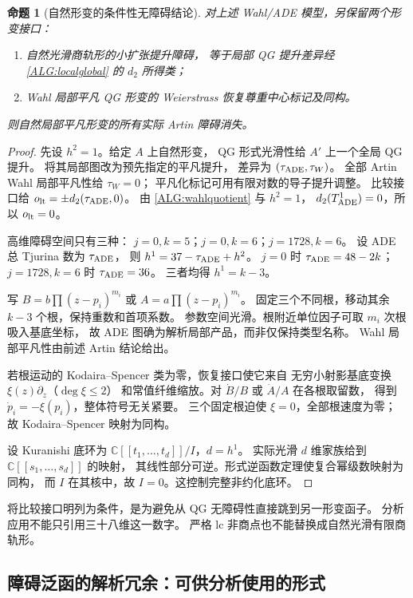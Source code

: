 \documentclass[UTF8,fontset=fandol,zihao=-4,oneside,openany]{ctexbook}
\theoremstyle{cjkplain}
\newtheorem{proposition}[theorem]{命题}
\numberwithin{equation}{chapter}
\begin{document}
\begin{proposition}[自然形变的条件性无障碍结论]
\label{ALG:naturalconditional}
对上述 Wahl/ADE 模型，另保留两个形变接口：
\begin{enumerate}
\item 自然光滑商轨形的小扩张提升障碍，
等于局部 QG 提升差异经 \eqref{ALG:localglobal} 的 $d_2$ 所得类；
\item Wahl 局部平凡 QG 形变的 Weierstrass 恢复尊重中心标记及同构。
\end{enumerate}
则自然局部平凡形变的所有实际 Artin 障碍消失。
\end{proposition}
\begin{proof}
先设 $h^2=1$。给定 $A$ 上自然形变，
QG 形式光滑性给 $A'$ 上一个全局 QG 提升。
将其局部图改为预先指定的平凡提升，
差异为 $(\tau_{\rm ADE},\tau_W)$。
全部 Artin Wahl 局部平凡性给 $\tau_W=0$；
平凡化标记可用有限对数的导子提升调整。
比较接口给 $o_{\rm lt}=\pm d_2(\tau_{\rm ADE},0)$。
由 \eqref{ALG:wahlquotient} 与 $h^2=1$，
$d_2(T^1_{\rm ADE})=0$，所以 $o_{\rm lt}=0$。

高维障碍空间只有三种：
$j=0,k=5$；$j=0,k=6$；$j=1728,k=6$。
设 ADE 总 Tjurina 数为 $\tau_{\rm ADE}$，
则 $h^1=37-\tau_{\rm ADE}+h^2$。
$j=0$ 时 $\tau_{\rm ADE}=48-2k$；
$j=1728,k=6$ 时 $\tau_{\rm ADE}=36$。
三者均得 $h^1=k-3$。

写 $B=b\prod(z-p_i)^{m_i}$ 或 $A=a\prod(z-p_i)^{m_i}$。
固定三个不同根，移动其余 $k-3$ 个根，保持重数和首项系数。
参数空间光滑。根附近单位因子可取 $m_i$ 次根吸入基底坐标，
故 ADE 图确为解析局部产品，而非仅保持类型名称。
Wahl 局部平凡性由前述 Artin 结论给出。

若根运动的 Kodaira--Spencer 类为零，恢复接口使它来自
无穷小射影基底变换 $\xi(z)\partial_z$（$\deg\xi\le2$）
和常值纤维缩放。对 $\dot B/B$ 或 $\dot A/A$ 在各根取留数，
得到 $\dot p_i=-\xi(p_i)$，整体符号无关紧要。
三个固定根迫使 $\xi=0$，全部根速度为零；
故 Kodaira--Spencer 映射为同构。

设 Kuranishi 底环为 $\mathbb C[[t_1,\ldots,t_d]]/I$，$d=h^1$。
实际光滑 $d$ 维家族给到 $\mathbb C[[s_1,\ldots,s_d]]$ 的映射，
其线性部分可逆。形式逆函数定理使复合幂级数映射为同构，
而 $I$ 在其核中，故 $I=0$。这控制完整非约化底环。
\end{proof}

将比较接口明列为条件，是为避免从 QG 无障碍性直接跳到另一形变函子。
分析应用不能只引用三十八维这一数字。
严格 lc 非商点也不能替换成自然光滑有限商轨形。

\subsection{障碍泛函的解析冗余：可供分析使用的形式}
\end{document}
